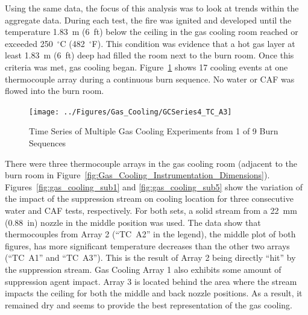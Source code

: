 \documentclass[12pt,oneside]{book}
\begin{document}
Using the same data, the focus of this analysis was to look at trends within the aggregate data. During each test, the fire was ignited and developed until the temperature 1.83~m (6~ft) below the ceiling in the gas cooling room reached or exceeded 250~$^{\circ}$C (482~$^{\circ}$F).  This condition was evidence that a hot gas layer at least 1.83~m (6~ft) deep had filled the room next to the burn room.  Once this criteria was met, gas cooling began. Figure~\ref{fig:gas_cooling_exp4} shows 17 cooling events at one thermocouple array during a continuous burn sequence.  No water or CAF was flowed into the burn room.   

\begin{figure}[ht!]
	\texttt{[image: ../Figures/Gas\_Cooling/GCSeries4\_TC\_A3]}
	\caption{Time Series of Multiple Gas Cooling Experiments from 1 of 9 Burn Sequences}
	\label{fig:gas_cooling_exp4}
\end{figure}

There were three thermocouple arrays in the gas cooling room (adjacent to the burn room in Figure~\ref{fig:Gas_Cooling_Instrumentation_Dimensions}). Figures~\ref{fig:gas_cooling_sub1} and \ref{fig:gas_cooling_sub5} show the variation of the impact of the suppression stream on cooling location for three consecutive water and CAF tests, respectively. For both sets, a solid stream from a 22~mm (0.88~in) nozzle in the middle position was used. The data show that thermocouples from Array 2 (``TC~A2'' in the legend), the middle plot of both figures, has more significant temperature decreases than the other two arrays (``TC~A1'' and ``TC~A3''). This is the result of Array 2 being directly ``hit'' by the suppression stream.  Gas Cooling Array 1 also exhibits some amount of suppression agent impact. Array 3 is located behind the area where the stream impacts the ceiling for both the middle and back nozzle positions. As a result, it remained dry and seems to provide the best representation of the gas cooling.
\end{document}
